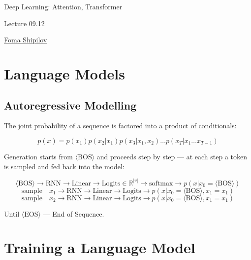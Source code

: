 \documentclass[10pt]{article}
\begin{document}
\begin{center}
    \Huge{Deep Learning: Attention, Transformer}
    
    \vspace{0.5cm}
    \huge{Lecture 09.12}

    \vspace{0.5cm}
    \large \href{https://t.me/foma2u}{Foma Shipilov}
\end{center}


\tableofcontents
\newpage

\section*{Language Models}

\subsection*{Autoregressive Modelling}

The joint probability of a sequence is factored into a product of conditionals:

\begin{equation*} 
p(x)=p(x_1) p(x_2 | x_1) p(x_3 | x_1, x_2) \ldots p (x_{T} | x_{1}\ldots x_{T-1})
\end{equation*}

Generation starts from $\langle\text{BOS}\rangle$ and proceeds step by step --- 
at each step a token is sampled and fed back into the model:

\begin{equation*} 
\langle\text{BOS}\rangle \rightarrow \text{RNN} \rightarrow \text{Linear} 
\rightarrow \text{Logits} \in \mathbb{R}^{|v|} \rightarrow \text{softmax} 
\rightarrow p (x | x_{0}= \langle\text{BOS}\rangle)
\end{equation*}
\begin{equation*} 
\text{sample}\quad x_1 \rightarrow \text{RNN} \rightarrow \text{Linear} 
\rightarrow \text{Logits} \rightarrow p (x | x_{0}= \langle\text{BOS}\rangle, x_1 = x_1)
\end{equation*}
\begin{equation*} 
\text{sample}\quad x_2 \rightarrow \text{RNN} \rightarrow \text{Linear} 
\rightarrow \text{Logits} \rightarrow p (x | x_{0}= \langle\text{BOS}\rangle, x_1 = x_1)
\end{equation*}

Until $\langle\text{EOS}\rangle$ --- End of Sequence.

\section*{Training a Language Model}
\end{document}
